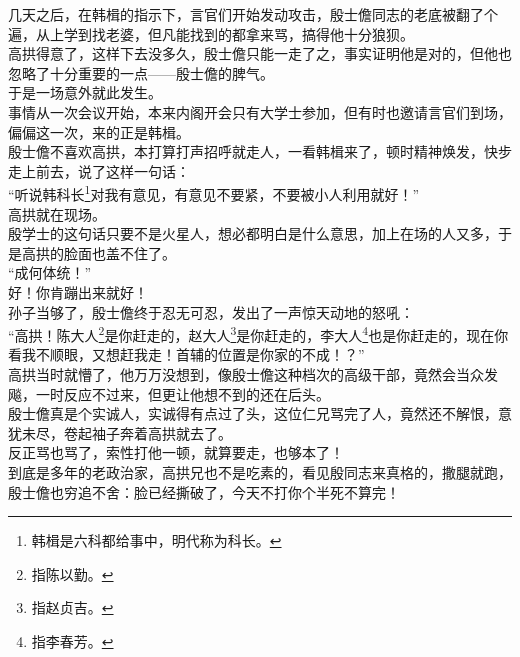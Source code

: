 \begin{multicols}{\theparacolNo}
几天之后，在韩楫的指示下，言官们开始发动攻击，殷士儋同志的老底被翻了个遍，从上学到找老婆，但凡能找到的都拿来骂，搞得他十分狼狈。\\

高拱得意了，这样下去没多久，殷士儋只能一走了之，事实证明他是对的，但他也忽略了十分重要的一点——殷士儋的脾气。\\

于是一场意外就此发生。\\

事情从一次会议开始，本来内阁开会只有大学士参加，但有时也邀请言官们到场，偏偏这一次，来的正是韩楫。\\

殷士儋不喜欢高拱，本打算打声招呼就走人，一看韩楫来了，顿时精神焕发，快步走上前去，说了这样一句话：\\

“听说韩科长\footnote{韩楫是六科都给事中，明代称为科长。}对我有意见，有意见不要紧，不要被小人利用就好！”\\

高拱就在现场。\\

殷学士的这句话只要不是火星人，想必都明白是什么意思，加上在场的人又多，于是高拱的脸面也盖不住了。\\

“成何体统！”\\

好！你肯蹦出来就好！\\

孙子当够了，殷士儋终于忍无可忍，发出了一声惊天动地的怒吼：\\

“高拱！陈大人\footnote{指陈以勤。}是你赶走的，赵大人\footnote{指赵贞吉。}是你赶走的，李大人\footnote{指李春芳。}也是你赶走的，现在你看我不顺眼，又想赶我走！首辅的位置是你家的不成！？”\\

高拱当时就懵了，他万万没想到，像殷士儋这种档次的高级干部，竟然会当众发飚，一时反应不过来，但更让他想不到的还在后头。\\

殷士儋真是个实诚人，实诚得有点过了头，这位仁兄骂完了人，竟然还不解恨，意犹未尽，卷起袖子奔着高拱就去了。\\

反正骂也骂了，索性打他一顿，就算要走，也够本了！\\

到底是多年的老政治家，高拱兄也不是吃素的，看见殷同志来真格的，撒腿就跑，殷士儋也穷追不舍：脸已经撕破了，今天不打你个半死不算完！\\


\end{multicols}
